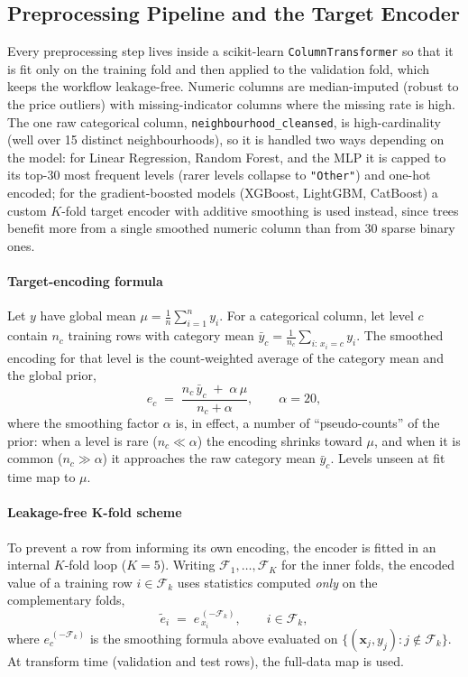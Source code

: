 \documentclass[journal]{IEEEtran}
\begin{document}
\subsection{Preprocessing Pipeline and the Target Encoder}
\label{sec:preproc}
Every preprocessing step lives inside a scikit-learn \texttt{ColumnTransformer}
so that it is fit only on the training fold and then applied to the validation
fold, which keeps the workflow leakage-free. Numeric columns are
median-imputed (robust to the price outliers) with missing-indicator
columns where the missing rate is high. The one raw categorical column,
\texttt{neighbourhood\_cleansed}, is high-cardinality (well over 15 distinct
neighbourhoods), so it is handled two ways depending on the model: for Linear
Regression, Random Forest, and the MLP it is capped to its top-30 most
frequent levels (rarer levels collapse to \texttt{"Other"}) and one-hot
encoded; for the gradient-boosted models (XGBoost, LightGBM, CatBoost) a
custom $K$-fold target encoder with additive smoothing is used instead, since
trees benefit more from a single smoothed numeric column than from 30 sparse
binary ones.

\paragraph{Target-encoding formula} Let $y$ have global mean
$\mu=\tfrac{1}{n}\sum_{i=1}^{n}y_i$. For a categorical column, let level $c$
contain $n_c$ training rows with category mean
$\bar y_c=\tfrac{1}{n_c}\sum_{i:\,x_i=c}y_i$. The smoothed encoding for that
level is the count-weighted average of the category mean and the global prior,
\begin{equation}
e_c \;=\; \frac{n_c\,\bar y_c \;+\; \alpha\,\mu}{\,n_c+\alpha\,},
\qquad \alpha = 20,
\label{eq:smooth}
\end{equation}
where the smoothing factor $\alpha$ is, in effect, a number of ``pseudo-counts''
of the prior: when a level is rare ($n_c\!\ll\!\alpha$) the encoding shrinks
toward $\mu$, and when it is common ($n_c\!\gg\!\alpha$) it approaches the raw
category mean $\bar y_c$. Levels unseen at fit time map to $\mu$.

\paragraph{Leakage-free K-fold scheme} To prevent a row from informing its own
encoding, the encoder is fitted in an internal $K$-fold loop ($K=5$). Writing
$\mathcal{F}_1,\dots,\mathcal{F}_K$ for the inner folds, the encoded value of a
training row $i\in\mathcal{F}_k$ uses statistics computed \emph{only} on the
complementary folds,
\begin{equation}
\tilde e_i \;=\; e^{\,(-\mathcal{F}_k)}_{\,x_i},
\qquad i\in\mathcal{F}_k,
\label{eq:kfoldte}
\end{equation}
where $e^{\,(-\mathcal{F}_k)}_{c}$ is the smoothing formula above evaluated on
$\{(\mathbf{x}_j,y_j):j\notin\mathcal{F}_k\}$. At transform time (validation and
test rows), the full-data map is used.
\end{document}
